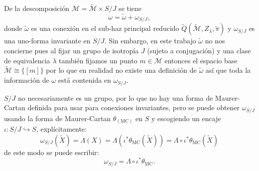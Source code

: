 De la descomposici\'{o}n $\mathcal{M} = \mathcal{\tilde{M}} \times S/J$ se tiene
%
\begin{equation}
\omega = \tilde{\omega} + \omega_{S/J},
\end{equation}
%
donde $\tilde{\omega}$ es una conexi\'{o}n en el sub-haz principal reducido $\tilde{Q}(\tilde{\mathcal{M}}, Z_{\lambda}, \tilde{\pi})$ y $\omega_{S/J}$ es una uno-forma invariante en $S/J$. Sin embargo, en este trabajo $\tilde{\omega}$ no nos concierne pues al fijar un grupo de isotrop\'{i}a $J$ (sujeto a conjugaci\'{o}n) y una clase de equivalencia $\lambda$ tambi\'{e}n fijamos un punto $m \in \mathcal{M}$ entonces el espacio base $\tilde{\mathcal{M}} \cong \{[m]\}$ por lo que en realidad no existe una definici\'{o}n de $\tilde{\omega}$ as\'{i} que toda la informaci\'{o}n de $\omega$ est\'{a} contenida en $\omega_{S/J}$.

$S/J$ no necesariamente es un grupo, por lo que no hay una forma de Maurer-Cartan definida para usar para conexiones invariantes, pero se puede obtener $\omega_{S/J}$ usando la forma de Maurer-Cartan $\theta_{(\mathrm{MC})}$ en $S$ y escogiendo un encaje $\iota: S/J \hookrightarrow S$, expl\'{i}citamente:
%
\begin{equation*}
\omega_{S/J} (\tilde{X}) = \Lambda (X) = \Lambda (\iota^{*} \theta_{\mathrm{MC}} (\tilde{X})) = \Lambda \circ \iota^{*} \theta_{\mathrm{MC}} (\tilde{X})
\end{equation*}
%
de este modo se puede escribir:
%
\begin{equation}
\omega_{S/J} = \Lambda \circ \iota^{*} \theta_{\mathrm{MC}}.
\end{equation}